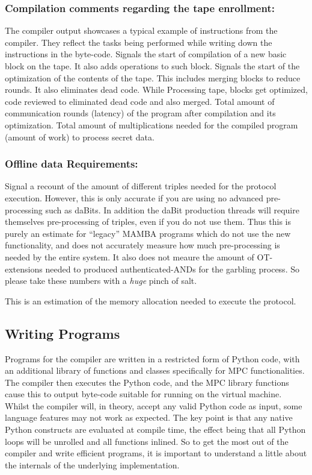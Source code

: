 \subsubsection{Compilation comments regarding the tape enrollment:} 
The compiler output showcases a typical example of instructions from the compiler. They reflect the tasks being performed while writing down the instructions in the byte-code.
Signals the start of compilation of a new basic block on the tape. It also adds operations to such block.
Signals the start of the optimization of the contents of the tape. This includes merging blocks to reduce rounds. It also eliminates dead code.
While Processing tape, blocks get optimized, code reviewed to eliminated dead code and also merged.
Total amount of communication rounds (latency) of the program after compilation and its optimization.
Total amount of multiplications needed for the compiled program (amount of work) to process secret data.

\subsubsection{Offline data Requirements:} 

Signal a recount of the amount of different triples needed for the protocol execution. 
However, this is only accurate if you are using no advanced pre-processing such
as daBits. In addition the daBit production threads will require themselves
pre-processing of triples, even if you do not use them. Thus this is purely an estimate
for ``legacy'' MAMBA programs which do not use the new functionality, and
does not accurately measure how much pre-processing is needed by the 
entire system.
It also does not meaure the amount of OT-extensions needed to produced
authenticated-ANDs for the garbling process.
So please take these numbers with a {\em huge} pinch of salt.

This is an estimation of the memory allocation needed to execute the protocol.

\subsection{Writing Programs}

Programs for the compiler are written in a restricted form of Python code,
with an additional library of functions and classes specifically for MPC
functionalities. The compiler then executes the Python code, and the MPC
library functions cause this to output
byte-code suitable for running on the virtual machine.
Whilst the compiler will, in theory, accept any valid Python
code as input, some language features may not work as expected.
The key point is that any native Python constructs are evaluated at compile
time, the effect being that all Python loops will be unrolled and all functions
inlined.
So to get the most out of the compiler and write efficient programs,
it is important to understand a little about the internals of the underlying implementation.

